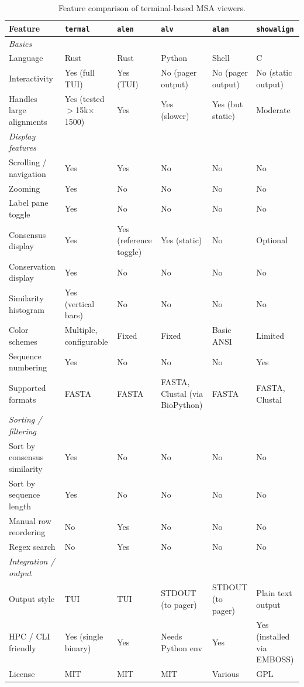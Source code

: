 \documentclass[11pt]{article}
\begin{document}
\begin{landscape}
\begin{table}[ht]
\centering
\small
\begin{tabularx}{\linewidth}{lXXXXX}
\toprule
\textbf{Feature} & \textbf{\texttt{termal}} & \textbf{\texttt{alen}} & \textbf{\texttt{alv}} & \textbf{\texttt{alan}} & \textbf{\texttt{showalign}} \\
\midrule
\textit{Basics} \\
Language & Rust & Rust & Python & Shell & C \\
Interactivity & Yes (full TUI) & Yes (TUI) & No (pager output) & No (pager output) & No (static output) \\
Handles large alignments & Yes (tested $>$15k$\times$1500) & Yes & Yes (slower) & Yes (but static) & Moderate \\
\midrule
\textit{Display features} \\
Scrolling / navigation & Yes & Yes & No & No & No \\
Zooming & Yes & No & No & No & No \\
Label pane toggle & Yes & No & No & No & No \\
Consensus display & Yes & Yes (reference toggle) & Yes (static) & No & Optional \\
Conservation display & Yes & No & No & No & No \\
Similarity histogram & Yes (vertical bars) & No & No & No & No \\
Color schemes & Multiple, configurable & Fixed & Fixed & Basic ANSI & Limited \\
Sequence numbering & Yes & No & No & No & Yes \\
Supported formats & FASTA & FASTA & FASTA, Clustal (via BioPython) & FASTA & FASTA, Clustal \\
\midrule
\textit{Sorting / filtering} \\
Sort by consensus similarity & Yes & No & No & No & No \\
Sort by sequence length & Yes & No & No & No & No \\
Manual row reordering & No & Yes & No & No & No \\
Regex search & No & Yes & No & No & No \\
\midrule
\textit{Integration / output} \\
Output style & TUI & TUI & STDOUT (to pager) & STDOUT (to pager) & Plain text output \\
HPC / CLI friendly & Yes (single binary) & Yes & Needs Python env & Yes & Yes (installed via EMBOSS) \\
License & MIT & MIT & MIT & Various & GPL \\
\bottomrule
\end{tabularx}
\caption{Feature comparison of terminal-based MSA viewers.}
\label{tab:msa-viewers}
\end{table}
\end{landscape}
\end{document}
